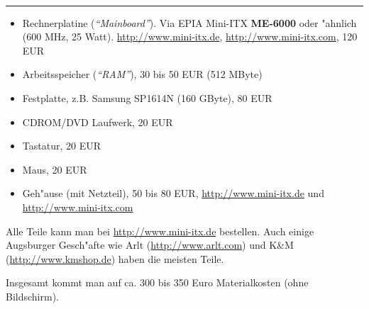 \documentclass[11pt]{article}
\begin{document}
\begin{minipage}[t]{7cm}
\hfill {\Large{}}\\
\hrule


\begin{itemize}
\item Rechnerplatine ({\em "`Mainboard"'}).
      Via EPIA Mini-ITX {\bf ME-6000} oder "ahnlich (600 MHz, 25 Watt).
      \url{http://www.mini-itx.de}, \url{http://www.mini-itx.com},
      120 EUR 

\item Arbeitsspeicher ({\em "`RAM"'}),
      30 bis 50 EUR  (512 MByte)

\item Festplatte, z.B. Samsung SP1614N (160 GByte),
      80 EUR 

\item CDROM/DVD Laufwerk, 20 EUR

\item Tastatur, 20 EUR

\item Maus, 20 EUR

\item Geh"ause (mit Netzteil), 50 bis 80 EUR,
  \url{http://www.mini-itx.de} und \url{http://www.mini-itx.com}

\end{itemize}







Alle Teile kann man bei \url{http://www.mini-itx.de} bestellen. Auch
einige Augsburger Gesch"afte wie Arlt (\url{http://www.arlt.com}) und 
K\&M (\url{http://www.kmshop.de}) haben die meisten Teile.

Insgesamt kommt man auf ca. 300 bis 350 Euro Materialkosten (ohne
Bildschirm).


\vskip 5mm


\end{minipage}
\end{document}
